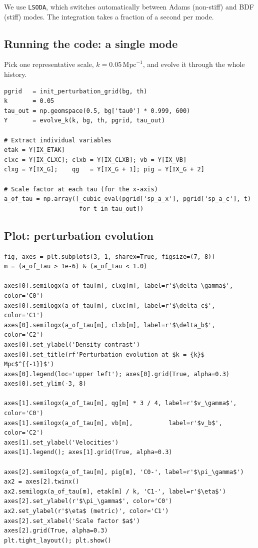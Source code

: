 \noindent We use \texttt{LSODA}, which switches automatically between Adams (non-stiff) and BDF (stiff) modes. The integration takes a fraction of a second per mode.

\subsection{Running the code: a single mode}

Pick one representative scale, $k = 0.05\,\mathrm{Mpc}^{-1}$, and evolve it through the whole history.

\begin{codebox}
\begin{lstlisting}[style=python]
pgrid   = init_perturbation_grid(bg, th)
k       = 0.05
tau_out = np.geomspace(0.5, bg['tau0'] * 0.999, 600)
Y       = evolve_k(k, bg, th, pgrid, tau_out)

# Extract individual variables
etak = Y[IX_ETAK]
clxc = Y[IX_CLXC]; clxb = Y[IX_CLXB]; vb = Y[IX_VB]
clxg = Y[IX_G];    qg   = Y[IX_G + 1]; pig = Y[IX_G + 2]

# Scale factor at each tau (for the x-axis)
a_of_tau = np.array([_cubic_eval(pgrid['sp_a_x'], pgrid['sp_a_c'], t)
                     for t in tau_out])
\end{lstlisting}
\end{codebox}

\subsection{Plot: perturbation evolution}

\begin{codebox}
\begin{lstlisting}[style=python]
fig, axes = plt.subplots(3, 1, sharex=True, figsize=(7, 8))
m = (a_of_tau > 1e-6) & (a_of_tau < 1.0)

axes[0].semilogx(a_of_tau[m], clxg[m], label=r'$\delta_\gamma$', color='C0')
axes[0].semilogx(a_of_tau[m], clxc[m], label=r'$\delta_c$',     color='C1')
axes[0].semilogx(a_of_tau[m], clxb[m], label=r'$\delta_b$',     color='C2')
axes[0].set_ylabel('Density contrast')
axes[0].set_title(rf'Perturbation evolution at $k = {k}$ Mpc$^{{-1}}$')
axes[0].legend(loc='upper left'); axes[0].grid(True, alpha=0.3)
axes[0].set_ylim(-3, 8)

axes[1].semilogx(a_of_tau[m], qg[m] * 3 / 4, label=r'$v_\gamma$', color='C0')
axes[1].semilogx(a_of_tau[m], vb[m],          label=r'$v_b$',      color='C2')
axes[1].set_ylabel('Velocities')
axes[1].legend(); axes[1].grid(True, alpha=0.3)

axes[2].semilogx(a_of_tau[m], pig[m], 'C0-', label=r'$\pi_\gamma$')
ax2 = axes[2].twinx()
ax2.semilogx(a_of_tau[m], etak[m] / k, 'C1-', label=r'$\eta$')
axes[2].set_ylabel(r'$\pi_\gamma$', color='C0')
ax2.set_ylabel(r'$\eta$ (metric)', color='C1')
axes[2].set_xlabel('Scale factor $a$')
axes[2].grid(True, alpha=0.3)
plt.tight_layout(); plt.show()
\end{lstlisting}
\end{codebox}

